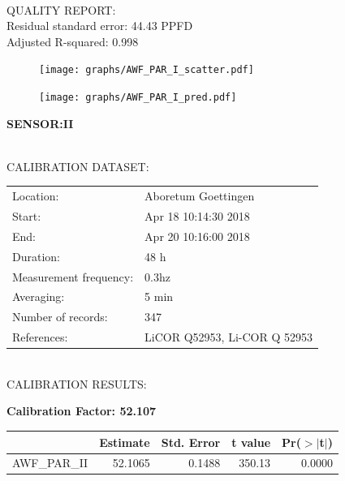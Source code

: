 \documentclass[oneside]{report}
\begin{document}
\hrulefill\\
QUALITY REPORT:\\
Residual standard error: 44.43 PPFD\\
Adjusted R-squared: 0.998



\begin{figure}[H]
  \centering
  \texttt{[image: graphs/AWF\_PAR\_I\_scatter.pdf]}
\end{figure}




\begin{figure}[H]
  \centering
  \texttt{[image: graphs/AWF\_PAR\_I\_pred.pdf]}
\end{figure}

\pagebreak


\begin{center}
\large{\textbf{SENSOR:II}}\\
\end{center}

\hrulefill\\
CALIBRATION DATASET:\\
\begin{table}[h!]
  \centering
  \label{tab:table1}
  \begin{tabular}{ll}
    Location: & Aboretum Goettingen\\ 
    
    
    Start:  & Apr 18 10:14:30 2018 \\
    End:   & Apr 20 10:16:00 2018\\ 
    Duration: & 48 h\\
    Measurement frequency: & 0.3hz\\
    Averaging:  &5 min\\
    Number of records: & 347 \\
    References: & LiCOR Q52953, Li-COR Q 52953 \\
  \end{tabular}
\end{table}

\hrulefill\\
CALIBRATION RESULTS:\\


\begin{center}
\textbf{\large{Calibration Factor: 52.107}}\\
\end{center}
\begin{table}[ht]
\centering
\begin{tabular}{rrrrr}
  \hline
 & Estimate & Std. Error & t value & Pr($>$$|$t$|$) \\ 
  \hline
AWF\_PAR\_II & 52.1065 & 0.1488 & 350.13 & 0.0000 \\ 
   \hline
\end{tabular}
\end{table}
\end{document}
